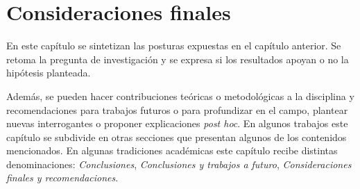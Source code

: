 \chapter{Consideraciones finales}

 \cite{Batini} En este capítulo se sintetizan las posturas expuestas en el capítulo anterior. Se retoma la pregunta de investigación y se expresa si los resultados apoyan o no la hipótesis planteada. 

Además, se pueden hacer contribuciones teóricas o metodológicas a la disciplina y recomendaciones para trabajos futuros o para profundizar en el campo, plantear nuevas interrogantes o proponer explicaciones \textit{post hoc}. En algunos trabajos este capítulo se subdivide en otras secciones que presentan algunos de los contenidos mencionados. 
En algunas tradiciones académicas este capítulo recibe distintas denominaciones: \textit{Conclusiones}, \textit{Conclusiones y trabajos a futuro}, \textit{Consideraciones finales y recomendaciones}. 

